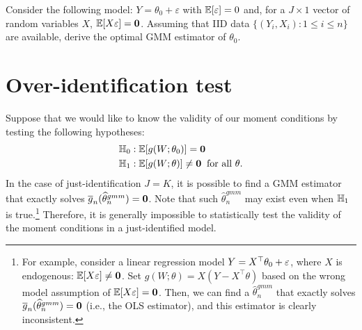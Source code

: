 \documentclass[11pt, A4paper, openany, uplatex]{book}
\begin{document}
\begin{exercise}\upshape
	Consider the following model: $Y = \theta_0 + \varepsilon$ with $\mathbb{E}[\varepsilon] = 0$ and, for a $J \times 1$ vector of random variables $X$, $\mathbb{E}[X \varepsilon] = \mathbf{0}$.
	Assuming that IID data $\{(Y_i,X_i): 1 \le i \le n\}$ are available, derive the optimal GMM estimator of $\theta_0$.
\end{exercise}

\section{Over-identification test}

Suppose that we would like to know the validity of our moment conditions by testing the following hypotheses:
\begin{align*}
	& \mathbb{H}_0: \mathbb{E}[g(W; \theta_0)] = \mathbf{0}\\
	& \mathbb{H}_1: \mathbb{E}[g(W; \theta)] \neq \mathbf{0} \;\; \text{for all $\theta$}.
\end{align*}
In the case of just-identification $J = K$, it is possible to find a GMM estimator that exactly solves $\overline g_n(\widehat \theta_n^{gmm}) = \mathbf{0}$.
Note that such $\hat \theta_n^{gmm}$ may exist even when $\mathbb{H}_1$ is true.\footnote{
	For example, consider a linear regression model $Y = X^\top \theta_0 + \varepsilon$, where $X$ is endogenous: $\mathbb{E}[X \varepsilon] \neq \mathbf{0}$.
	Set $g(W; \theta) = X(Y - X^\top\theta)$ based on the wrong model assumption of $\mathbb{E}[X \varepsilon] = \mathbf{0}$.
	Then, we can find a $\hat \theta_n^{gmm}$ that exactly solves $\overline g_n(\widehat \theta_n^{gmm}) = \mathbf{0}$ (i.e., the OLS estimator), and this estimator is clearly inconsistent.
	}
Therefore, it is generally impossible to statistically test the validity of the moment conditions in a just-identified model.
\end{document}
